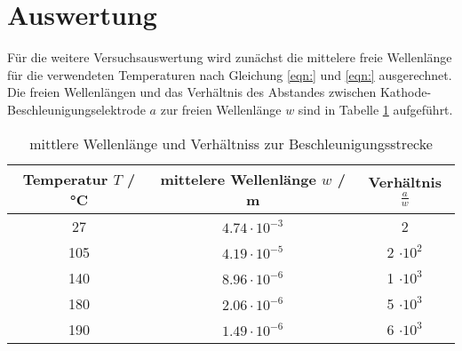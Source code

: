 \section{Auswertung}
\label{sec:Auswertung}
Für die weitere Versuchsauswertung wird zunächst die mittelere freie Wellenlänge für die verwendeten Temperaturen nach Gleichung \ref{eqn:} und \ref{eqn:} ausgerechnet. Die freien Wellenlängen und das Verhältnis des Abstandes zwischen Kathode-Beschleunigungselektrode $a$ zur freien Wellenlänge $w$ sind in Tabelle \ref{tab:mitWel} aufgeführt. 
\begin{table}
  \centering
  \begin{tabular}{c c c}
    \toprule
    	Temperatur $T$ / °C & mittelere Wellenlänge $w$ / m & Verhältnis $\frac{a}{w}$ \\
    \midrule
    	27  & $4.74 \cdot 10^{-3}$	& 2			\\
      	105 & $4.19 \cdot 10^{-5}$	& 2 $\cdot 10^2$	\\
	140 & $8.96 \cdot 10^{-6}$	& 1 $\cdot 10^3$	\\
	180 & $2.06 \cdot 10^{-6}$	& 5 $\cdot 10^3$	\\
	190 & $1.49 \cdot 10^{-6}$	& 6 $\cdot 10^3$	\\
	\bottomrule
  \end{tabular}
  \caption{mittlere Wellenlänge und Verhältniss zur Beschleunigungsstrecke}
  \label{tab:mitWel}
\end{table}

